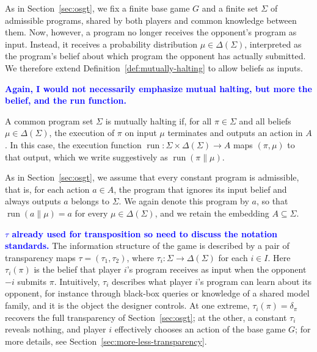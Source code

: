 \documentclass[twoside,11pt]{article}
\newcommand{\boldblue}[1]{\textbf{\textcolor{blue}{#1}}}
\begin{document}
As in Section~\ref{sec:osgt}, we fix a finite base game $G$ and a finite set $\Sigma$ of admissible programs, shared by both players and common knowledge between them. Now, however, a program no longer receives the opponent's program as input. Instead, it receives a probability distribution $\mu \in \Delta(\Sigma)$, interpreted as the program's belief about which program the opponent has actually submitted. We therefore extend Definition~\ref{def:mutually-halting} to allow beliefs as inputs.

\boldblue{Again, I would not necessarily emphasize mutual halting, but more the belief, and the run function.}
\begin{definition}\label{def:mutually-halting-2}
  A common program set $\Sigma$ is mutually halting if, for all $\pi \in \Sigma$ and all beliefs $\mu \in \Delta(\Sigma)$, the execution of $\pi$ on input $\mu$ terminates and outputs an action in $A$. In this case, the execution function $\operatorname{run} \colon \Sigma \times \Delta(\Sigma) \to A$ maps $(\pi, \mu)$ to that output, which we write suggestively as
  $\operatorname{run}(\pi \mathrel{\|} \mu)$.
\end{definition}

As in Section~\ref{sec:osgt}, we assume that every constant program is admissible, that is, for each action $a \in A$, the program that ignores its input belief and always outputs $a$ belongs to $\Sigma$. We again denote this program by $a$, so that $\operatorname{run}(a \| \mu) = a$ for every $\mu \in \Delta(\Sigma)$, and we retain the embedding $A \subseteq \Sigma$.

\boldblue{$\tau$ already used for transposition so need to discuss the notation standards.}
The information structure of the game is described by a pair of transparency maps $\tau = (\tau_1, \tau_2)$, where $\tau_i \colon \Sigma \to \Delta(\Sigma)$ for each $i \in I$. Here $\tau_i(\pi)$ is the belief that player $i$'s program receives as input when the opponent $-i$ submits $\pi$. Intuitively, $\tau_i$ describes what player $i$'s program can learn about its opponent, for instance through black-box queries or knowledge of a shared model family, and it is the object the designer controls. At one extreme, $\tau_i(\pi) = \delta_\pi$ recovers the full transparency of Section~\ref{sec:osgt}; at the other, a constant $\tau_i$ reveals nothing, and player $i$ effectively chooses an action of the base game $G$; for more details, see Section~\ref{sec:more-less-transparency}.
\end{document}

